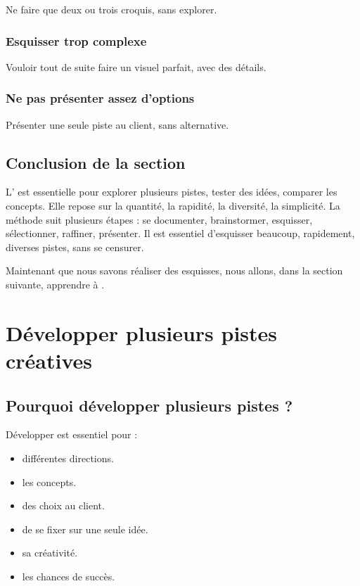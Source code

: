 Ne faire que deux ou trois croquis, sans explorer.

\subsubsection{Esquisser trop complexe}

Vouloir tout de suite faire un visuel parfait, avec des détails.

\subsubsection{Ne pas présenter assez d'options}

Présenter une seule piste au client, sans alternative.

\subsection*{Conclusion de la section}

L' est essentielle pour explorer plusieurs pistes, tester des idées, comparer les concepts. Elle repose sur la quantité, la rapidité, la diversité, la simplicité. La méthode suit plusieurs étapes : se documenter, brainstormer, esquisser, sélectionner, raffiner, présenter. Il est essentiel d'esquisser beaucoup, rapidement, diverses pistes, sans se censurer.

Maintenant que nous savons réaliser des esquisses, nous allons, dans la section suivante, apprendre à .

\section{Développer plusieurs pistes créatives}

\subsection{Pourquoi développer plusieurs pistes ?}

Développer  est essentiel pour :

\begin{itemize}
    \item {} différentes directions.
    \item {} les concepts.
    \item {} des choix au client.
    \item {} de se fixer sur une seule idée.
    \item {} sa créativité.
    \item {} les chances de succès.
\end{itemize}


